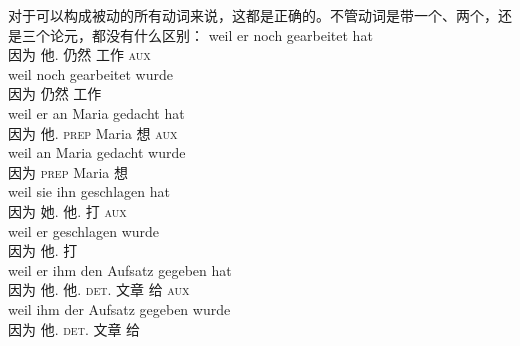 \noindent
对于可以构成被动的所有动词来说，这都是正确的。不管动词是带一个、两个，还是三个论元，都没有什么区别：
\eal
\label{beispiel-arbeiten}
\ex 
\gll weil er noch gearbeitet hat\\
	 因为 他.\nom{} 仍然 工作 \textsc{aux}\\
\ex 
\gll weil noch gearbeitet wurde\\
	 因为 仍然 工作 \passivepst\\
\zl
\eal
\label{beispiel-denken}
\ex 
\gll weil er an Maria gedacht hat\\
	 因为 他.\nom{} \textsc{prep} Maria 想 \textsc{aux}\\
\ex 
\gll weil an Maria gedacht wurde\\
	 因为 \textsc{prep} Maria 想 \passivepst\\
\zl
\eal
\ex 
\gll weil sie ihn geschlagen hat\\
	 因为 她.\nom{} 他.\acc{} 打 \textsc{aux}\\
\ex 
\gll weil er geschlagen wurde\\
	 因为 他.\nom{} 打 \passivepst\\
\zl
\eal
\ex 
\gll weil er ihm den Aufsatz gegeben hat\\
      因为 他.\nom{} 他.\dat{} \textsc{det}.\acc{} 文章 给 \textsc{aux}\\
\ex 
\gll weil ihm der Aufsatz gegeben wurde\\
     因为 他.\dat{} \textsc{det}.\nom{} 文章 给 \passivepst\\
\zl

